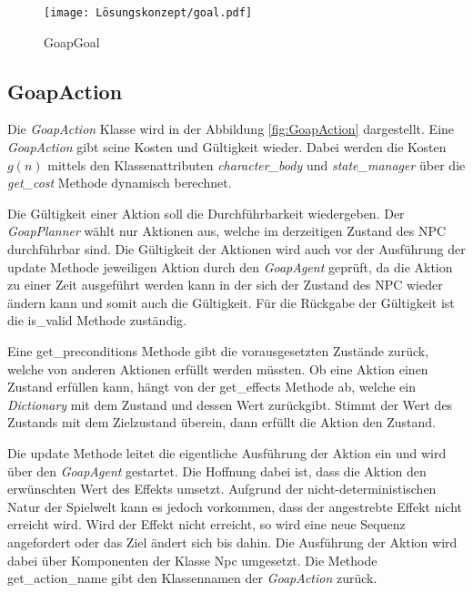 \begin{figure}[t]
  \centering
  \texttt{[image: Lösungskonzept/goal.pdf]}
	\captionsetup{justification=justified, format=plain}
  \caption{GoapGoal}
  \label{fig:GoapGoal}
\end{figure}







\subsection{GoapAction}
\label{chap:goapaction uml}

Die \textit{GoapAction} Klasse wird in der Abbildung \ref{fig:GoapAction} dargestellt. Eine \textit{GoapAction} gibt seine Kosten und Gültigkeit wieder. Dabei werden die Kosten $g(n)$ mittels den Klassenattributen \textit{character\_body} und \textit{state\_manager} über die \textit{get\_cost} Methode dynamisch berechnet.

Die Gültigkeit einer Aktion soll die Durchführbarkeit wiedergeben. Der \textit{GoapPlanner} wählt nur Aktionen aus, welche im derzeitigen Zustand des NPC durchführbar sind. Die Gültigkeit der Aktionen wird auch vor der Ausführung der update Methode jeweiligen Aktion durch den \textit{GoapAgent} geprüft, da die Aktion zu einer Zeit ausgeführt werden kann in der sich der Zustand des NPC wieder ändern kann und somit auch die Gültigkeit. Für die Rückgabe der Gültigkeit ist die is\_valid Methode zuständig.

Eine get\_preconditions Methode gibt die vorausgesetzten Zustände zurück, welche von anderen Aktionen erfüllt werden müssten. Ob eine Aktion einen Zustand erfüllen kann, hängt von der get\_effects Methode ab, welche ein \textit{Dictionary} mit dem Zustand und dessen Wert zurückgibt. Stimmt der Wert des Zustands mit dem Zielzustand überein, dann erfüllt die Aktion den Zustand.

Die update Methode leitet die eigentliche Ausführung der Aktion ein und wird über den \textit{GoapAgent} gestartet. Die Hoffnung dabei ist, dass die Aktion den erwünschten Wert des Effekts umsetzt. Aufgrund der nicht-deterministischen Natur der Spielwelt kann es jedoch vorkommen, dass der angestrebte Effekt nicht erreicht wird. Wird der Effekt nicht erreicht, so wird eine neue Sequenz angefordert oder das Ziel ändert sich bis dahin. Die Ausführung der Aktion wird dabei über Komponenten der Klasse Npc umgesetzt. Die Methode get\_action\_name gibt den Klassennamen der \textit{GoapAction} zurück.


